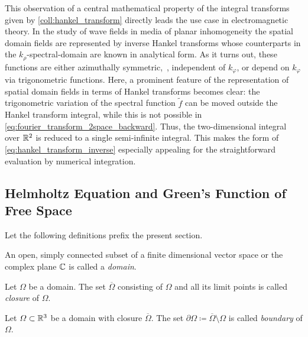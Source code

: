 This observation of a central mathematical property of the integral transforms
given by \cref{coll:hankel_transform} directly leads the use case in
electromagnetic theory.
In the study of wave fields in media of planar inhomogeneity the spatial domain
fields are represented by inverse Hankel transforms whose counterparts in the 
$k_\rho$-spectral-domain are known in analytical form.
As it turns out, these functions are either azimuthally symmetric,~\ie,
independent of $k_\varphi$, or depend on $k_\varphi$ via trigonometric
functions. 
Here, a prominent feature of the representation of spatial domain fields in
terms of Hankel transforms becomes clear: the trigonometric variation of the
spectral function $\tilde{f}$
can be moved outside the Hankel transform integral, while this is not
possible in \eqref{eq:fourier_transform_2space_backward}.
Thus, the two-dimensional integral over $\mathbb{R}^2$ is reduced to a single
semi-infinite integral.
This makes the form of \eqref{eq:hankel_transform_inverse} especially appealing
for the straightforward evaluation by numerical integration.








\subsection{Helmholtz Equation and Green's Function of Free Space}
\label{subsec:helmholtz_eq_and_gf}

Let the following definitions prefix the present section.
\begin{definition}[Domain]
	An open, simply connected subset of a finite dimensional vector space or
	the complex plane $\mathbb{C}$ is
	called a \emph{domain}.
\end{definition}
\begin{definition}[Closure]
	Let $\Omega$ be a domain.
	The set $\overline{\Omega}$ consisting of $\Omega$ and all its limit points
	is called \emph{closure} of $\Omega$.
\end{definition}
\begin{definition}[Boundary]
	Let $\Omega \subset \mathbb{R}^3$ be a domain with closure $\overline{\Omega}$.
	The set $\partial\Omega \coloneqq \overline{\Omega}\setminus\Omega$
	is called \emph{boundary} of $\Omega$.
\end{definition}

